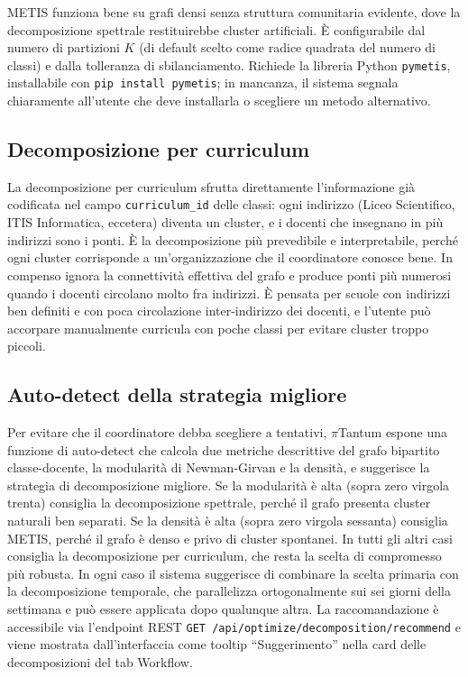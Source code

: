 METIS funziona bene su grafi densi senza struttura
comunitaria evidente, dove la decomposizione spettrale
restituirebbe cluster artificiali. \`E configurabile dal
numero di partizioni $K$ (di default scelto come radice
quadrata del numero di classi) e dalla tolleranza di
sbilanciamento. Richiede la libreria Python \texttt{pymetis},
installabile con \texttt{pip install pymetis}; in mancanza,
il sistema segnala chiaramente all'utente che deve
installarla o scegliere un metodo alternativo.

\subsection{Decomposizione per curriculum}

La decomposizione per curriculum sfrutta direttamente
l'informazione gi\`a codificata nel campo
\texttt{curriculum\_id} delle classi: ogni indirizzo (Liceo
Scientifico, ITIS Informatica, eccetera) diventa un cluster,
e i docenti che insegnano in pi\`u indirizzi sono i ponti.
\`E la decomposizione pi\`u prevedibile e interpretabile,
perch\'e ogni cluster corrisponde a un'organizzazione che il
coordinatore conosce bene. In compenso ignora la
connettivit\`a effettiva del grafo e produce ponti pi\`u
numerosi quando i docenti circolano molto fra indirizzi. \`E
pensata per scuole con indirizzi ben definiti e con poca
circolazione inter-indirizzo dei docenti, e l'utente pu\`o
accorpare manualmente curricula con poche classi per evitare
cluster troppo piccoli.

\subsection{Auto-detect della strategia migliore}

Per evitare che il coordinatore debba scegliere a tentativi,
$\pi$Tantum espone una funzione di auto-detect che calcola
due metriche descrittive del grafo bipartito classe-docente,
la modularit\`a di Newman-Girvan e la densit\`a, e suggerisce
la strategia di decomposizione migliore. Se la modularit\`a
\`e alta (sopra zero virgola trenta) consiglia la
decomposizione spettrale, perch\'e il grafo presenta cluster
naturali ben separati. Se la densit\`a \`e alta (sopra zero
virgola sessanta) consiglia METIS, perch\'e il grafo \`e
denso e privo di cluster spontanei. In tutti gli altri casi
consiglia la decomposizione per curriculum, che resta la
scelta di compromesso pi\`u robusta. In ogni caso il sistema
suggerisce di combinare la scelta primaria con la
decomposizione temporale, che parallelizza ortogonalmente
sui sei giorni della settimana e pu\`o essere applicata
dopo qualunque altra. La raccomandazione \`e accessibile via
l'endpoint REST \texttt{GET /api/optimize/decomposition/recommend}
e viene mostrata dall'interfaccia come tooltip
``Suggerimento'' nella card delle decomposizioni del tab
Workflow.

